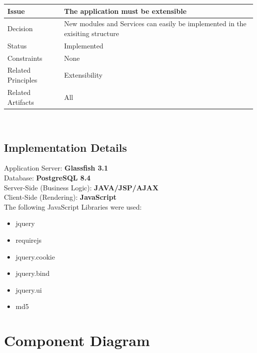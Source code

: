 \documentclass[a4paper]{article}
\begin{document}
\begin{tabular}[t]{|l|p{10cm}|}
\hline
\textbf{Issue}	&	The application must be extensible\\
\hline
Decision & New modules and Services can easily be implemented in the exisiting structure\\
\hline
Status	& Implemented\\
\hline
Constraints	&	None\\
\hline
Related Principles	&	Extensibility\\
\hline
Related Artifacts	&	All\\
\hline
\end{tabular}\\

\subsection{Implementation Details}

Application Server: \textbf{Glassfish 3.1}\\
Database: \textbf{PostgreSQL 8.4}\\
Server-Side (Business Logic): \textbf{JAVA/JSP/AJAX}\\
Client-Side (Rendering): \textbf{JavaScript}\\

The following JavaScript Libraries were used:
\begin{itemize}
\item jquery
\item requirejs
\item jquery.cookie
\item jquery.bind
\item jquery.ui
\item md5
\end{itemize}


\clearpage

\section{Component Diagram}
\end{document}

